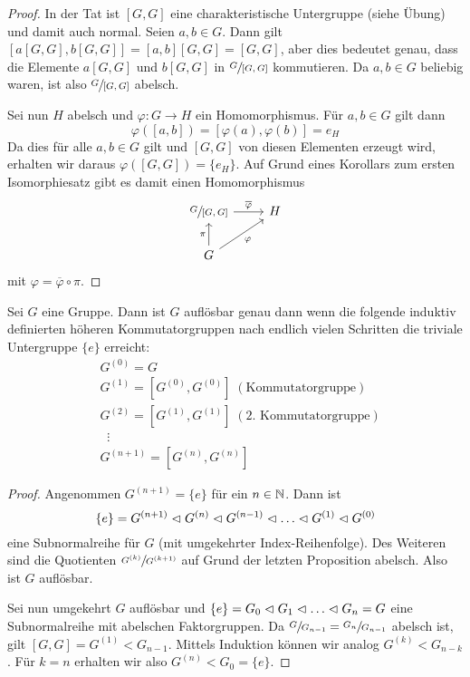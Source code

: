 \begin{proof}
	In der Tat ist $[G,G]$ eine charakteristische Untergruppe (siehe Übung) und damit auch normal.
	Seien $a,b \in G$. Dann gilt $[a [G,G], b [G,G]] = [a,b][G,G] = [G,G]$, aber dies bedeutet genau,
	dass die Elemente $a[G,G]$ und $b[G,G]$ in $\sfrac{G}{[G,G]}$ kommutieren.
	Da $a,b \in G$ beliebig waren, ist also $\sfrac{G}{[G,G]}$ abelsch.

	Sei nun $H$ abelsch und $\varphi: G \to H$ ein Homomorphismus. Für $a,b \in G$ gilt dann
	\[
		\varphi([a,b]) = [\varphi(a), \varphi(b)] = e_{H}
	\]
	Da dies für alle $a,b \in G$ gilt und $[G,G]$ von diesen Elementen erzeugt wird, erhalten wir daraus
	$\varphi([G,G]) = \{e_{H}\}$. Auf Grund eines Korollars zum ersten Isomorphiesatz gibt es damit
	einen Homomorphismus
	\[
		\begin{tikzcd}
			{\sfrac{G}{[G,G]}} \arrow[r, "\overline{\varphi}"] & H \\
			G \arrow[u, "\pi"] \arrow[ru, "\varphi"']          &  
		\end{tikzcd}
	\] 
	mit $\varphi = \overline{\varphi} \circ \pi$.
\end{proof}

\begin{proposition}
	Sei $G$ eine Gruppe. Dann ist $G$ auflösbar genau dann wenn die folgende induktiv definierten
	höheren Kommutatorgruppen nach endlich vielen Schritten die triviale Untergruppe $\{e\}$ erreicht:
	\begin{align*}
		&G^{(0)} = G \\
		&G^{(1)} = [G^{(0)}, G^{(0)}] \;(\text{Kommutatorgruppe})\\
		&G^{(2)} = [G^{(1)}, G^{(1)}] \;(\text{2. Kommutatorgruppe})\\
		&\;\;\vdots \\
		&G^{(n+1)} = [G^{(n)}, G^{(n)}]
	\end{align*}
\end{proposition}

\begin{proof}
	Angenommen $G^{(n+1)} = \{e\}$ für ein $n \in \mathbb{N}$. Dann ist
	\[
	\{e\} = G^{(n+1)} \vartriangleleft G^{(n)} \vartriangleleft G^{(n-1)} \vartriangleleft \ldots \vartriangleleft G^{(1)} \vartriangleleft G^{(0)}
	\] 
	eine Subnormalreihe für $G$ (mit umgekehrter Index-Reihenfolge).
	Des Weiteren sind die Quotienten $\sfrac{G^{(k)}}{G^{(k+1)}}$ auf Grund der letzten Proposition abelsch.
	Also ist $G$ auflösbar.

	Sei nun umgekehrt $G$ auflösbar und $\{e\} = G_0 \vartriangleleft G_1 \vartriangleleft \ldots \vartriangleleft G_{n} = G$ eine Subnormalreihe mit abelschen Faktorgruppen.
	Da $\sfrac{G}{G_{n-1}} = \sfrac{G_{n}}{G_{n-1}}$ abelsch ist, gilt $[G,G] = G^{(1)} < G_{n-1}$.
	Mittels Induktion können wir analog $G^{(k)} < G_{n-k}$.
	Für $k = n$ erhalten wir also $G^{(n)} < G_0 = \{e\}$.
\end{proof}

